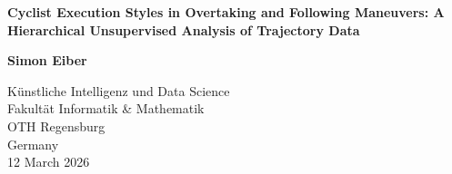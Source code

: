 \begin{titlepage}
    \begin{center}
        \vspace*{1cm}
            
        \Large
        \textbf{Cyclist Execution Styles in Overtaking and Following Maneuvers: A Hierarchical Unsupervised Analysis of Trajectory Data}
            
            
        \vspace{1.5cm}
            
        \textbf{Simon Eiber}
        
            
        \vfill

            
        \vspace{0.8cm}
            
        \Large
        Künstliche Intelligenz und Data Science\\
        Fakultät Informatik \& Mathematik\\
        OTH Regensburg\\
        Germany\\
        12 March 2026
            
    \end{center}
\end{titlepage}

